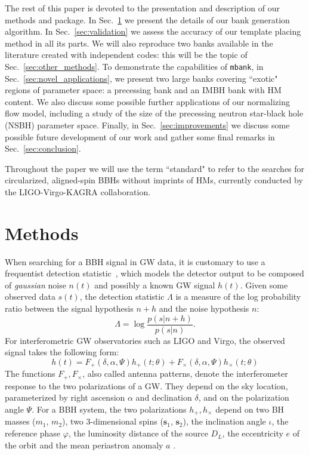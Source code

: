 \documentclass[twocolumn,showpacs,preprintnumbers,nofootinbib,prd,
superscriptaddress,10pt]{revtex4-2}
\begin{document}
The rest of this paper is devoted to the presentation and description of our methods and package.
In Sec.~\ref{sec:methods} we present the details of our bank generation algorithm.
In Sec.~\ref{sec:validation} we assess the accuracy of our template placing method in all its parts.
We will also reproduce two banks available in the literature \cite{Harry:2017weg, Sakon:2022ibh} created with independent codes: this will be the topic of Sec.~\ref{sec:other_methods}.
To demonstrate the capabilities of \texttt{mbank}, in Sec.~\ref{sec:novel_applications}, we present two large banks covering ``exotic" regions of parameter space: a precessing bank and an IMBH bank with HM content. We also discuss some possible further applications of our normalizing flow model, including a study of the size of the precessing neutron star-black hole (NSBH) parameter space.
Finally, in Sec.~\ref{sec:improvements} we discuss some possible future development of our work and gather some final remarks in Sec.~\ref{sec:conclusion}.

Throughout the paper we will use the term ``standard" to refer to the searches for circularized, aligned-spin BBHs without imprints of HMs, currently conducted by the LIGO-Virgo-KAGRA collaboration.

\section{Methods} \label{sec:methods}

When searching for a BBH signal in GW data, it is customary to use a frequentist detection statistic~\cite{Creighton_book, Maggiore:2007ulw, Harry:2016ijz, Harry:2017weg}, which models the detector output to be composed of {\it gaussian} noise $n(t)$ and possibly a known GW signal $h(t)$.
Given some observed data $s(t)$, the detection statistic $\Lambda$ is a measure of the log probability ratio between the signal hypothesis $n+h$ and the noise hypothesis $n$:
\begin{equation}\label{eq:LL}
	\Lambda = \log\frac{p(s|n+h)}{p(s| n)}.
\end{equation}
For interferometric GW observatories such as LIGO and Virgo, the observed signal takes the following form:
\begin{equation}\label{eq:signal_model}
	h(t) = F_+(\delta, \alpha, \Psi) h_+(t;\theta) + F_\times(\delta, \alpha, \Psi) h_\times(t;\theta)
\end{equation}
The functions $F_+, F_\times$, also called antenna patterns, denote the interferometer response to the two polarizations of a GW. They depend on the sky location, parameterized by right ascension $\alpha$ and declination $\delta$, and on the polarization angle $\Psi$. 
For a BBH system, the two polarizations $h_+, h_\times$ depend on two BH masses ($m_1$, $m_2$), two 3-dimensional spins ($\mathbf{s}_1$, $\mathbf{s}_2$), the inclination angle $\iota$, the reference phase $\varphi$, the luminosity distance of the source $D_L$, the eccentricity $e$ of the orbit and the mean periastron anomaly $a$ \cite{Sathyaprakash_2009}.
\end{document}
